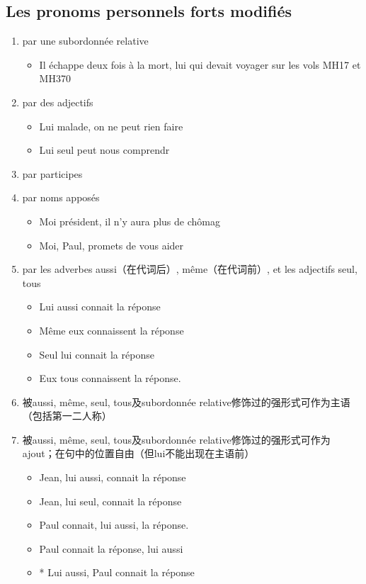 \documentclass[UTF8]{report}
\begin{document}
\subsection{Les pronoms personnels forts modifiés}
\begin{enumerate}
    \item par une subordonnée relative
    \begin{itemize}
        \item Il échappe deux fois à la mort, lui qui devait voyager sur les vols MH17 et MH370
    \end{itemize}
    \item par des adjectifs
    \begin{itemize}
        \item Lui malade, on ne peut rien faire
        \item Lui seul peut nous comprendr
    \end{itemize}
    \item par participes
    \item par noms apposés
    \begin{itemize}
        \item Moi président, il n’y aura plus de chômag
        \item Moi, Paul, promets de vous aider
    \end{itemize}
    \item par les adverbes aussi（在代词后）, même（在代词前）, et les adjectifs seul, tous
    \begin{itemize}
        \item Lui aussi connait la réponse
        \item Même eux connaissent la réponse
        \item Seul lui connait la réponse
        \item Eux tous connaissent la réponse.
    \end{itemize}
    \item 被aussi, même, seul, tous及subordonnée relative修饰过的强形式可作为主语（包括第一二人称）
    \item 被aussi, même, seul, tous及subordonnée relative修饰过的强形式可作为ajout；在句中的位置自由（但lui不能出现在主语前）
    \begin{itemize}
        \item Jean, lui aussi, connait la réponse
        \item Jean, lui seul, connait la réponse
        \item Paul connait, lui aussi, la réponse.
        \item Paul connait la réponse, lui aussi
        \item * Lui aussi, Paul connait la réponse
    \end{itemize}
\end{enumerate}
\end{document}
